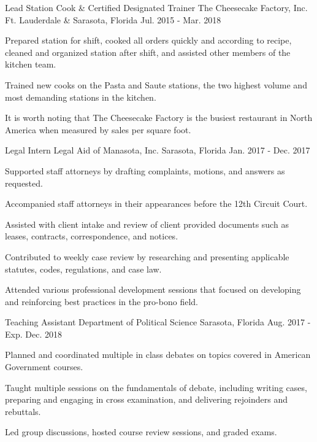 \begin{cventries}
  \cventry
    {Lead Station Cook \& Certified Designated Trainer} %
    {The Cheesecake Factory, Inc.} %
    {Ft. Lauderdale \& Sarasota, Florida} %
    {Jul. 2015 - Mar. 2018} %
    {
      \begin{cvitems} %
        \item {Prepared station for shift, cooked all orders quickly and according to recipe, cleaned and organized station after shift, and assisted other members of the kitchen team.}
        \item {Trained new cooks on the Pasta and Saute stations, the two highest volume and most demanding stations in the kitchen.}
        \item {It is worth noting that The Cheesecake Factory is the busiest restaurant in North America when measured by sales per square foot.}
      \end{cvitems}
    }

  \cventry
    {Legal Intern} %
    {Legal Aid of Manasota, Inc.} %
    {Sarasota, Florida} %
    {Jan. 2017 - Dec. 2017} %
    {
      \begin{cvitems} %
        \item {Supported staff attorneys by drafting complaints, motions, and answers as requested.}
        \item {Accompanied staff attorneys in their appearances before the 12th Circuit Court.}
        \item {Assisted with client intake and review of client provided documents such as leases, contracts, correspondence, and notices.}
        \item {Contributed to weekly case review by researching and presenting applicable statutes, codes, regulations, and case law.}
        \item {Attended various professional development sessions that focused on developing and reinforcing best practices in the pro-bono field.}
      \end{cvitems}
    }

  \cventry
    {Teaching Assistant} %
    {Department of Political Science} %
    {Sarasota, Florida} %
    {Aug. 2017 - Exp. Dec. 2018} %
    {
      \begin{cvitems} %
        \item {Planned and coordinated multiple in class debates on topics covered in American Government courses.}
        \item {Taught multiple sessions on the fundamentals of debate, including writing cases, preparing and engaging in cross examination, and delivering rejoinders and rebuttals.}
        \item {Led group discussions, hosted course review sessions, and graded exams.}
      \end{cvitems}
    }


\end{cventries}
